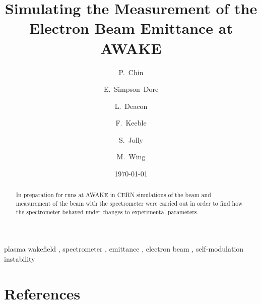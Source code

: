 \documentclass[5p,twocolumn,sort&compress]{elsarticle}
\title{Simulating the Measurement of the\\Electron Beam Emittance at AWAKE}
\author[ucl]{P.~Chin}
\author[ucl]{E.~Simpson~Dore}
\author[ucl]{L.~Deacon}
\author[ucl]{F.~Keeble}
\author[ucl]{S.~Jolly}
\author[ucl]{M.~Wing}
\date{\today}
\begin{document}


\begin{frontmatter}
	\begin{abstract}
		In preparation for runs at AWAKE in CERN simulations of the beam
		and measurement of the beam with the spectrometer were carried out
		in order to find how the spectrometer behaved under changes to
		experimental parameters.
	\end{abstract}

		\begin{keyword}
			plasma wakefield \sep
			spectrometer \sep
			emittance \sep
			electron beam \sep
			self-modulation instability
		\end{keyword}
\end{frontmatter}


\clearpage
\twocolumn[
	\begin{@twocolumnfalse}
		\tableofcontents
	\end{@twocolumnfalse}
]
\clearpage








% 

\clearpage
\section*{References}


\end{document}

